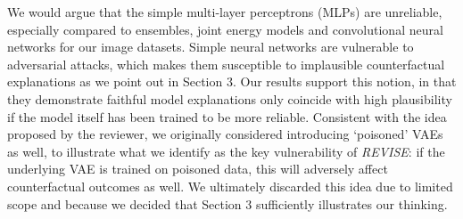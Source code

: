 \documentclass[letterpaper]{article} %
\begin{document}
We would argue that the simple multi-layer perceptrons (MLPs) are unreliable, especially compared to ensembles, joint energy models and convolutional neural networks for our image datasets. Simple neural networks are vulnerable to adversarial attacks, which makes them susceptible to implausible counterfactual explanations as we point out in Section 3. Our results support this notion, in that they demonstrate faithful model explanations only coincide with high plausibility if the model itself has been trained to be more reliable. Consistent with the idea proposed by the reviewer, we originally considered introducing `poisoned' VAEs as well, to illustrate what we identify as the key vulnerability of \textit{REVISE}: if the underlying VAE is trained on poisoned data, this will adversely affect counterfactual outcomes as well. We ultimately discarded this idea due to limited scope and because we decided that Section 3 sufficiently illustrates our thinking. 
\end{document}
